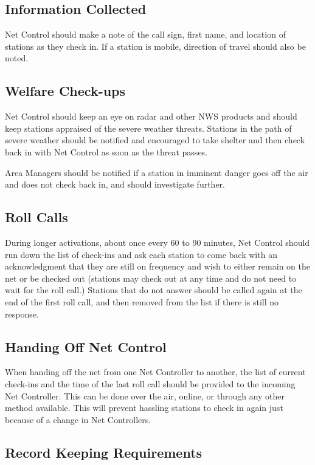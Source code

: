 \documentclass[pdflatex,letterpaper,twoside,12pt]{book}
\begin{document}
\subsection{Information Collected}

Net Control should make a note of the call sign, first name, and location of stations as they check in.  If a station is mobile, direction of travel should also be noted.

\subsection{Welfare Check-ups}

Net Control should keep an eye on radar and other NWS products and should keep stations appraised of the severe weather threats.  Stations in the path of severe weather should be notified and encouraged to take shelter and then check back in with Net Control as soon as the threat passes.

Area Managers should be notified if a station in imminent danger goes off the air and does not check back in, and should investigate further.

\subsection{Roll Calls}

During longer activations, about once every 60 to 90 minutes, Net Control should run down the list of check-ins and ask each station to come back with an acknowledgment that they are still on frequency and wish to either remain on the net or be checked out (stations may check out at any time and do not need to wait for the roll call.)  Stations that do not answer should be called again at the end of the first roll call, and then removed from the list if there is still no response.

\subsection{Handing Off Net Control}

When handing off the net from one Net Controller to another, the list of current check-ins and the time of the last roll call should be provided to the incoming Net Controller.  This can be done over the air, online, or through any other method available.  This will prevent hassling stations to check in again just because of a change in Net Controllers.

\subsection{Record Keeping Requirements}
\end{document}
